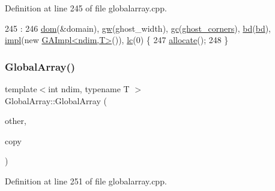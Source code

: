 Definition at line 245 of file globalarray.\+cpp.


\begin{DoxyCode}
245                                                                                                            
              :
246   \hyperlink{classshark_1_1ndim_1_1_global_array_a412e192f4c7a15888da625ae833e8d3e}{dom}(&domain), \hyperlink{classshark_1_1ndim_1_1_global_array_a38d93d114d585e5e5491c5ecd35c6bfc}{gw}(ghost\_width), \hyperlink{classshark_1_1ndim_1_1_global_array_a100f4d523420deffde330079df7501e2}{gc}(\hyperlink{classshark_1_1ndim_1_1_global_array_abf0c9312657087578f89e1279ee6c451}{ghost\_corners}), \hyperlink{classshark_1_1ndim_1_1_global_array_aead89700a3d1d960432c6dc971251a9c}{bd}(\hyperlink{classshark_1_1ndim_1_1_global_array_aead89700a3d1d960432c6dc971251a9c}{bd}), 
      \hyperlink{classshark_1_1ndim_1_1_global_array_a70684121da4badfef791c15d7076282f}{impl}(\textcolor{keyword}{new} \hyperlink{classshark_1_1ndim_1_1_g_a_impl}{GAImpl<ndim,T>}()), \hyperlink{classshark_1_1ndim_1_1_global_array_a8248f4bd6e1f48d25148dd6d5288cb4c}{lc}(0) \{
247     \hyperlink{classshark_1_1ndim_1_1_global_array_ad7054741564c962156640415d208dc72}{allocate}();
248 \}
\end{DoxyCode}
\hypertarget{classshark_1_1ndim_1_1_global_array_a97e27f44095bf15566679fbb45377e2f}{}\label{classshark_1_1ndim_1_1_global_array_a97e27f44095bf15566679fbb45377e2f} 
\subsubsection{\texorpdfstring{Global\+Array()}{GlobalArray()}\hspace{0.1cm}{\footnotesize\ttfamily [3/5]}}
{\footnotesize\ttfamily template$<$int ndim, typename T $>$ \\
Global\+Array\+::\+Global\+Array (\begin{DoxyParamCaption}\item[{const \hyperlink{classshark_1_1ndim_1_1_global_array}{Global\+Array}$<$ ndim, T $>$ \&}]{other,  }\item[{bool}]{copy }\end{DoxyParamCaption})}



Definition at line 251 of file globalarray.\+cpp.


